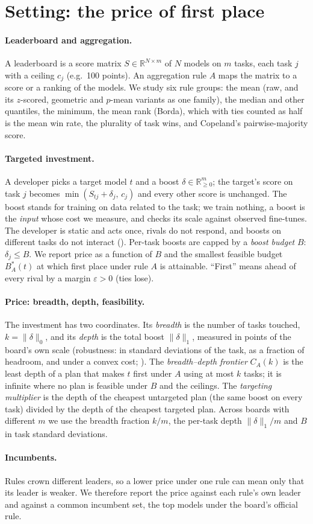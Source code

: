 \section{Setting: the price of first place}
\label{sec:setting}

\paragraph{Leaderboard and aggregation.}
A leaderboard is a score matrix $S\in\mathbb{R}^{N\times m}$ of $N$ models on $m$ tasks, each task $j$ with a ceiling $c_j$ (e.g.\ 100 points). An aggregation rule $A$ maps the matrix to a score or a ranking of the models. We study six rule groups: the mean (raw, and its $z$-scored, geometric and $p$-mean variants as one family), the median and other quantiles, the minimum, the mean rank (Borda), which with ties counted as half is the mean win rate, the plurality of task wins, and Copeland's pairwise-majority score.

\paragraph{Targeted investment.}
A developer picks a target model $t$ and a boost $\delta\in\mathbb{R}^m_{\ge 0}$; the target's score on task $j$ becomes $\min(S_{tj}+\delta_j,\,c_j)$ and every other score is unchanged. The boost stands for training on data related to the task; we train nothing, a boost is the \emph{input} whose cost we measure, and  checks its scale against observed fine-tunes. The developer is static and acts once, rivals do not respond, and boosts on different tasks do not interact (). Per-task boosts are capped by a \emph{boost budget} $B$: $\delta_j\le B$. We report price as a function of $B$ and the smallest feasible budget $B^\ast_A(t)$ at which first place under rule $A$ is attainable. ``First'' means ahead of every rival by a margin $\varepsilon>0$ (ties lose).

\paragraph{Price: breadth, depth, feasibility.}
The investment has two coordinates. Its \emph{breadth} is the number of tasks touched, $k=\lVert\delta\rVert_0$, and its \emph{depth} is the total boost $\lVert\delta\rVert_1$, measured in points of the board's own scale (robustness: in standard deviations of the task, as a fraction of headroom, and under a convex cost; ). The \emph{breadth--depth frontier} $C_A(k)$ is the least depth of a plan that makes $t$ first under $A$ using at most $k$ tasks; it is infinite where no plan is feasible under $B$ and the ceilings. The \emph{targeting multiplier} is the depth of the cheapest untargeted plan (the same boost on every task) divided by the depth of the cheapest targeted plan. Across boards with different $m$ we use the breadth fraction $k/m$, the per-task depth $\lVert\delta\rVert_1/m$ and $B$ in task standard deviations.

\paragraph{Incumbents.}
Rules crown different leaders, so a lower price under one rule can mean only that its leader is weaker. We therefore report the price against each rule's own leader and against a common incumbent set, the top models under the board's official rule.

